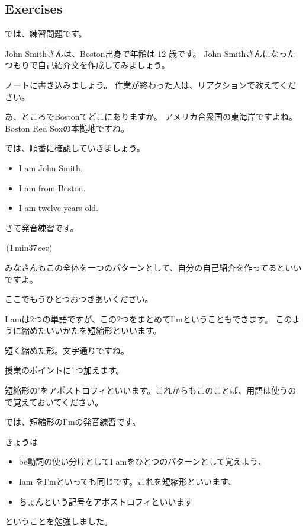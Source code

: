 \documentclass[book,jafontscale=0.9247]{jlreq}
\newcommand{\mySagyo}{%
\begin{minipage}[t]{.98\textwidth}
\mbox{}\hrulefill\mbox{}\par%
\mbox{}\hfill{}\raisebox{-5pt}{作業}\hfill\mbox{}\par%
\mbox{}\hrulefill\mbox{}
\end{minipage}%
\par%
\bigskip
}
\begin{document}
%
%
%
%

\newpage
\subsection{Exercises}
では、練習問題です。

John Smithさんは、Boston出身で年齢は 12 歳です。
John Smithさんになったつもりで自己紹介文を作成してみましょう。


ノートに書き込みましょう。
作業が終わった人は、リアクションで教えてください。

\mySagyo

あ、ところでBostonてどこにありますか。
アメリカ合衆国の東海岸ですよね。
Boston Red Soxの本拠地ですね。

では、順番に確認していきましょう。

\begin{itemize}
 \item I am John Smith.
 \item I am from Boston.
 \item I am twelve years old.
\end{itemize}

さて発音練習です。

\faVolumeUp\,(1\,min37\,sec)

みなさんもこの全体を一つのパターンとして、自分の自己紹介を作ってるといいですよ。


ここでもうひとつおつきあいください。

{\large \ComputerMouse}

I amは2つの単語ですが、この2つをまとめてI'mということもできます。
このように縮めたいいかたを短縮形といいます。

短く縮めた形。文字通りですね。

授業のポイントに1つ加えます。

短縮形の'をアポストロフィといいます。これからもこのことば、用語は使うので覚えておいてください。


では、短縮形のI'mの発音練習です。

きょうは
\begin{itemize}
 \item be動詞の使い分けとしてI amをひとつのパターンとして覚えよう、
 \item Iam をI'mといっても同じです。これを短縮形といいます、
 \item ちょんという記号をアポストロフィといいます
\end{itemize}
ということを勉強しました。
\end{document}
